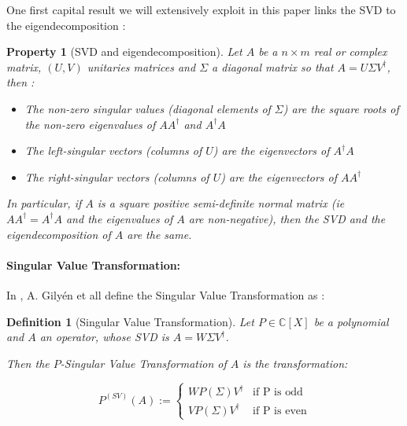 \documentclass{article}
\newtheorem{propriete}{Property}[section]
\newtheorem{definition}{Definition}[section]
\begin{document}
One first capital result we will extensively exploit in this paper links the SVD to the eigendecomposition :

\begin{propriete}[SVD and eigendecomposition]\label{propriete:svd_eigen}
    Let $A$ be a $n\times m$ real or complex matrix, $(U,V)$ unitaries matrices and $\Sigma$ a diagonal matrix so that $A = U\Sigma V^\dagger$, then :
    \begin{itemize}
        \item The non-zero singular values (diagonal elements of $\Sigma$) are the square roots of the non-zero eigenvalues of $AA^\dagger$ and $A^\dagger A$
        \item The left-singular vectors (columns of $U$) are the eigenvectors of $A^\dagger A$
        \item The right-singular vectors (columns of $U$) are the eigenvectors of $A A^\dagger$
    \end{itemize}
    
    In particular, if $A$ is a square positive semi-definite normal matrix (ie $AA^\dagger = A^\dagger A$ and the eigenvalues of $A$ are non-negative), then the SVD and the eigendecomposition of $A$ are the same.
    
\end{propriete}

\paragraph{Singular Value Transformation:}

In \cite{gilyén_su_low_wiebe_2019}, A. Gilyén et all define the Singular Value Transformation as :

\begin{definition}[Singular Value Transformation]
Let $P \in \mathbb{C}[X]$ be a polynomial and $A$ an operator, whose SVD is $A = W\Sigma V^\dagger$. 

Then the $P$-Singular Value Transformation of $A$ is the transformation:

\begin{equation}
        P^{(SV)}(A) := \left\{ \begin{array}{cc}
            WP(\Sigma)V^\dagger & \mbox{if P is odd} \\
            VP(\Sigma)V^\dagger & \mbox{if P is even}
        \end{array} \right.
\end{equation}

\end{definition}
\end{document}
